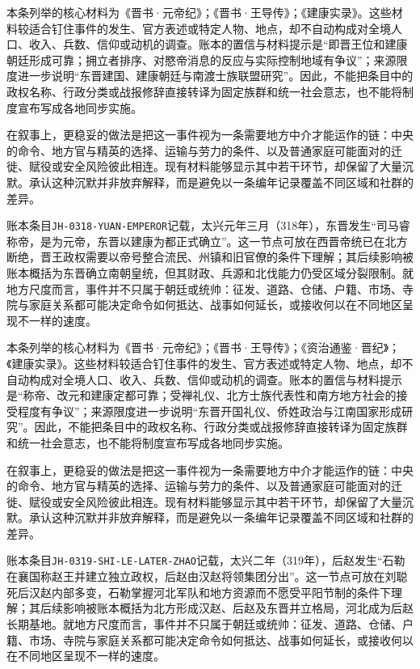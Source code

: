 本条列举的核心材料为《晋书·元帝纪》；《晋书·王导传》；《建康实录》。这些材料较适合钉住事件的发生、官方表述或特定人物、地点，却不自动构成对全境人口、收入、兵数、信仰或动机的调查。账本的置信与材料提示是“即晋王位和建康朝廷形成可靠；拥立者排序、对愍帝消息的反应与实际控制地域有争议”；来源限度进一步说明“东晋建国、建康朝廷与南渡士族联盟研究”。因此，不能把条目中的政权名称、行政分类或战报修辞直接转译为固定族群和统一社会意志，也不能将制度宣布写成各地同步实施。

在叙事上，更稳妥的做法是把这一事件视为一条需要地方中介才能运作的链：中央的命令、地方官与精英的选择、运输与劳力的条件、以及普通家庭可能面对的迁徙、赋役或安全风险彼此相连。现有材料能够显示其中若干环节，却保留了大量沉默。承认这种沉默并非放弃解释，而是避免以一条编年记录覆盖不同区域和社群的差异。

账本条目\texttt{JH-0318-YUAN-EMPEROR}记载，太兴元年三月（318年），东晋发生“司马睿称帝，是为元帝，东晋以建康为都正式确立”。这一节点可放在西晋帝统已在北方断绝，晋王政权需要以帝号整合流民、州镇和旧官僚的条件下理解；其后续影响被账本概括为东晋确立南朝皇统，但其财政、兵源和北伐能力仍受区域分裂限制。就地方尺度而言，事件并不只属于朝廷或统帅：征发、道路、仓储、户籍、市场、寺院与家庭关系都可能决定命令如何抵达、战事如何延长，或接收何以在不同地区呈现不一样的速度。

本条列举的核心材料为《晋书·元帝纪》；《晋书·王导传》；《资治通鉴·晋纪》；《建康实录》。这些材料较适合钉住事件的发生、官方表述或特定人物、地点，却不自动构成对全境人口、收入、兵数、信仰或动机的调查。账本的置信与材料提示是“称帝、改元和建康定都可靠；受禅礼仪、北方士族代表性和南方地方社会的接受程度有争议”；来源限度进一步说明“东晋开国礼仪、侨姓政治与江南国家形成研究”。因此，不能把条目中的政权名称、行政分类或战报修辞直接转译为固定族群和统一社会意志，也不能将制度宣布写成各地同步实施。

在叙事上，更稳妥的做法是把这一事件视为一条需要地方中介才能运作的链：中央的命令、地方官与精英的选择、运输与劳力的条件、以及普通家庭可能面对的迁徙、赋役或安全风险彼此相连。现有材料能够显示其中若干环节，却保留了大量沉默。承认这种沉默并非放弃解释，而是避免以一条编年记录覆盖不同区域和社群的差异。

账本条目\texttt{JH-0319-SHI-LE-LATER-ZHAO}记载，太兴二年（319年），后赵发生“石勒在襄国称赵王并建立独立政权，后赵由汉赵将领集团分出”。这一节点可放在刘聪死后汉赵内部多变，石勒掌握河北军队和地方资源而不愿受平阳节制的条件下理解；其后续影响被账本概括为北方形成汉赵、后赵及东晋并立格局，河北成为后赵长期基地。就地方尺度而言，事件并不只属于朝廷或统帅：征发、道路、仓储、户籍、市场、寺院与家庭关系都可能决定命令如何抵达、战事如何延长，或接收何以在不同地区呈现不一样的速度。

